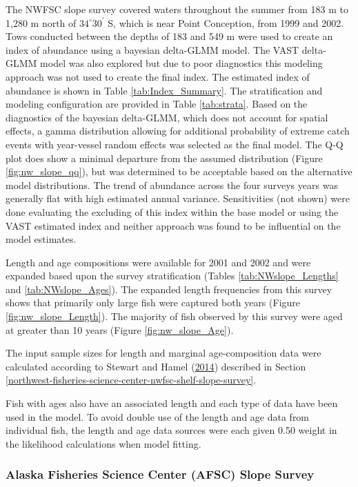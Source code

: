 \documentclass[12pt,]{article}
\begin{document}
The NWFSC slope survey covered waters throughout the summer from 183 m
to 1,280 m north of \(34^\circ 30^\prime\) S, which is near Point
Conception, from 1999 and 2002. Tows conducted between the depths of 183
and 549 m were used to create an index of abundance using a bayesian
delta-GLMM model. The VAST delta-GLMM model was also explored but due to
poor diagnostics this modeling approach was not used to create the final
index. The estimated index of abundance is shown in Table
\ref{tab:Index_Summary}. The stratification and modeling configuration
are provided in Table \ref{tab:strata}. Based on the diagnostics of the
bayesian delta-GLMM, which does not account for spatial effects, a gamma
distribution allowing for additional probability of extreme catch events
with year-vessel random effects was selected as the final model. The Q-Q
plot does show a minimal departure from the assumed distribution (Figure
\ref{fig:nw_slope_qq}), but was determined to be acceptable based on the
alternative model distributions. The trend of abundance across the four
surveys years was generally flat with high estimated annual variance.
Sensitivities (not shown) were done evaluating the excluding of this
index within the base model or using the VAST estimated index and
neither approach was found to be influential on the model estimates.

Length and age compositions were available for 2001 and 2002 and were
expanded based upon the survey stratification (Tables
\ref{tab:NWslope_Lengths} and \ref{tab:NWslope_Ages}). The expanded
length frequencies from this survey shows that primarily only large fish
were captured both years (Figure \ref{fig:nw_slope_Length}). The
majority of fish observed by this survey were aged at greater than 10
years (Figure \ref{fig:nw_slope_Age}).

The input sample sizes for length and marginal age-composition data were
calculated according to Stewart and Hamel
(\protect\hyperlink{ref-stewart_bootstrapping_2014}{2014}) described in
Section
\ref{northwest-fisheries-science-center-nwfsc-shelf-slope-survey}.

Fish with ages also have an associated length and each type of data have
been used in the model. To avoid double use of the length and age data
from individual fish, the length and age data sources were each given
0.50 weight in the likelihood calculations when model fitting.

\subsubsection{Alaska Fisheries Science Center (AFSC) Slope
Survey}\label{alaska-fisheries-science-center-afsc-slope-survey}
\end{document}
